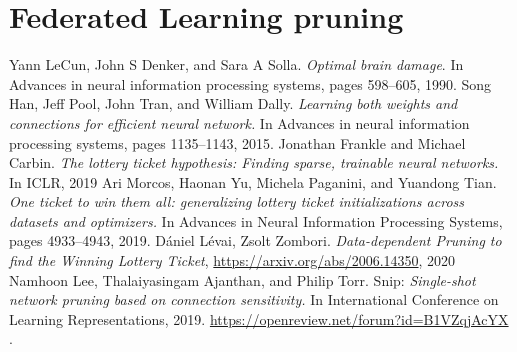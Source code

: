 \documentclass{article}
\theoremstyle{theorem}
\theoremstyle{definition}
\begin{document}
\section{Federated Learning pruning}
	\begin{thebibliography}{5}
	Yann LeCun, John S Denker, and Sara A Solla. \textit{Optimal brain damage}. In Advances in neural information processing systems, pages 598–605, 1990.
 Song Han, Jeff Pool, John Tran, and William Dally.\textit{ Learning both weights and connections for
efficient neural network.} In Advances in neural information processing systems, pages 1135–1143,
2015.
Jonathan Frankle and Michael Carbin.\textit{ The lottery ticket hypothesis: Finding sparse, trainable
neural networks.} In ICLR, 2019
Ari Morcos, Haonan Yu, Michela Paganini, and Yuandong Tian.\textit{ One ticket to win them all: generalizing lottery ticket initializations across datasets and optimizers.} In Advances in Neural Information Processing Systems, pages 4933–4943, 2019.
Dániel Lévai, Zsolt Zombori. \textit{Data-dependent Pruning to find the Winning Lottery Ticket}, \href{https://arxiv.org/abs/2006.14350}{https://arxiv.org/abs/2006.14350}, 2020
Namhoon Lee, Thalaiyasingam Ajanthan, and Philip Torr. Snip: \textit{Single-shot network pruning
based on connection sensitivity.} In International Conference on Learning Representations, 2019.
\href{https://openreview.net/forum?id=B1VZqjAcYX}{https://openreview.net/forum?id=B1VZqjAcYX} .
\end{thebibliography}
\end{document}
